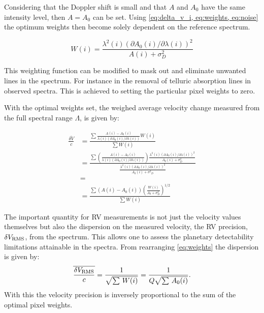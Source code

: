 Considering that the Doppler shift is small and that \(A\) and \(A_0\) have the same intensity level, then \(A = A_0\) can be set.
Using \cref{eq:delta_v_i, eq:weights, eq:noise} the optimum weights then become solely dependent on the reference spectrum.

\begin{equation}
W(i) = \frac{{\lambda}^{2}(i) {({\partial A_0(i)}/{\partial \lambda(i)})}^{2}}{A(i) + {\sigma}^{2}_{D}} \label{eq:optimal_weight}
\end{equation}

This weighting function can be modified to mask out and eliminate unwanted lines in the spectrum.
For instance in the removal of telluric absorption lines in observed spectra.
This is achieved to setting the particular pixel weights to zero.

With the optimal weights set, the weighed average velocity change measured from the full spectral range \(\Lambda\), is given by:

\begin{eqnarray}
    \frac{\overline{\delta V}}{c} &= \frac{
        \sum{
            \frac{
                A(i) - A_0(i)}{
                \lambda(i) \left({\partial A_0(i)}/{\partial \lambda(i)}\right)} W(i)}}{
             \sum{{W(i)}}} \\
    &= \frac{
        \sum {
            (\frac
                {A(i) - A_0(i)}
                {\lambda(i) (\partial A_0(i)/\partial \lambda(i))}) \frac
                    {{\lambda}^{2}(i) {({\partial A_0(i)}/{\partial \lambda(i)})}^{2}}
                    {A_{0}(i) + {\sigma}^{2}_{D}}
                 }
         }
    {\frac
        {{\lambda}^{2}(i) {({\partial A_0(i)}/{\partial \lambda(i)})}^{2}}{A_{0}(i) + {{\sigma}^{2}}_{D}}
        } \\
    &= \\
    &= \frac{\sum{(A(i) - A_0(i)){\left(\frac{W(i)}{A_0 +{\sigma}_{D}^{2}}\right)}^{1/2}}}{\sum{W(i)}}
    \label{eq:delta_v_eqarray}
\end{eqnarray}

The important quantity for {RV} measurements is not just the velocity values themselves but also the dispersion on the measured velocity, the RV precision, \(\delta V_{\textrm{RMS}}\), from the spectrum.
This allows one to assess the planetary detectability limitations attainable in the spectra.
From rearranging \cref{eq:weights} the dispersion is given by:
\begin{equation}
    \overline{\frac{\delta V_{\textrm{RMS}}}{c}} = \frac{1}{\sqrt{\sum{\,W(i)}}} = \frac{1}{Q \sqrt{\sum{\,A_0(i)}}}. \label{eq:dv_rms}
\end{equation}
With this the velocity precision is inversely proportional to the sum of the optimal pixel weights.

